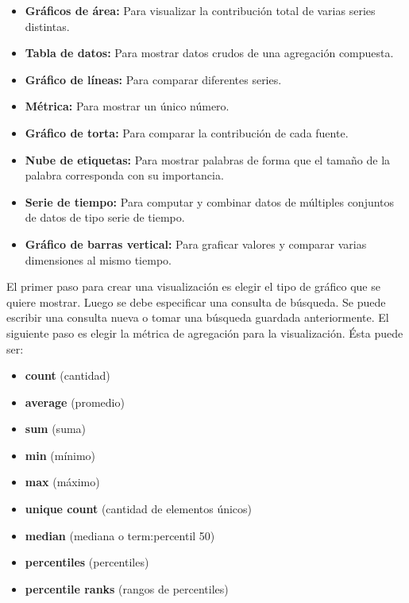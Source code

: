 \begin{itemize}

  \item \textbf{Gráficos de área:}
  Para visualizar la contribución total de varias series distintas.

  \item \textbf{Tabla de datos:}
  Para mostrar datos crudos de una agregación compuesta.

  \item \textbf{Gráfico de líneas:}
  Para comparar diferentes series.

  \item \textbf{Métrica:}
  Para mostrar un único número.

  \item \textbf{Gráfico de torta:}
  Para comparar la contribución de cada fuente.

  \item \textbf{Nube de etiquetas:}
  Para mostrar palabras de forma que el tamaño de la palabra corresponda con su importancia.

  \item \textbf{Serie de tiempo:}
  Para computar y combinar datos de múltiples conjuntos de datos de tipo serie de tiempo.

  \item \textbf{Gráfico de barras vertical:}
  Para graficar valores y comparar varias dimensiones al mismo tiempo.

\end{itemize}


El primer paso para crear una visualización es elegir el tipo de gráfico que se
quiere mostrar. Luego se debe especificar una consulta de búsqueda. Se puede
escribir una consulta nueva o tomar una búsqueda guardada anteriormente. El
siguiente paso es elegir la métrica de agregación para la visualización. Ésta
puede ser:

\begin{itemize}
  \item \textbf{count} (cantidad)
  \item \textbf{average} (promedio)
  \item \textbf{sum} (suma)
  \item \textbf{min} (mínimo)
  \item \textbf{max} (máximo)
  \item \textbf{unique count} (cantidad de elementos únicos)
  \item \textbf{median} (mediana o \gls{term:percentil} 50)
  \item \textbf{percentiles} (percentiles)
  \item \textbf{percentile ranks} (rangos de percentiles)
\end{itemize}

